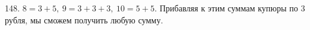 148. $8=3+5,\ 9=3+3+3,\ 10=5+5.$ Прибавляя к этим суммам купюры по 3 рубля, мы сможем получить любую сумму.\\
